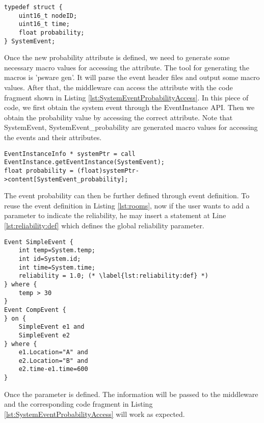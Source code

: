\begin{lstlisting}[caption=Customized system event, label=lst:SystemEventProbability]
typedef struct {
	uint16_t nodeID;
	uint16_t time;
	float probability;
} SystemEvent;
\end{lstlisting}

Once the new probability attribute is defined, we need to generate some necessary macro values for accessing the attribute. The tool for generating the macros is 'psware gen'. It will parse the event header files and output some macro values. After that, the middleware can access the attribute with the code fragment shown in Listing \ref{lst:SystemEventProbabilityAccess}. In this piece of code, we first obtain the system event through the EventInstance API. Then we obtain the probability value by accessing the correct attribute. Note that SystemEvent, SystemEvent\_probability are generated macro values for accessing the events and their attributes.

\begin{lstlisting}[caption=Customized system event, label=lst:SystemEventProbabilityAccess]
EventInstanceInfo * systemPtr = call EventInstance.getEventInstance(SystemEvent);
float probability = (float)systemPtr->content[SystemEvent_probability];
\end{lstlisting}

The event probability can then be further defined through event definition. To reuse the event definition in Listing \ref{lst:rooms}, now if the user wants to add a parameter to indicate the reliability, he may insert a statement at Line \ref{lst:reliability:def} which defines the global reliability parameter.

\begin{lstlisting}[caption=Example of event definition with reliability, label=lst:reliability]
Event SimpleEvent {
	int temp=System.temp;
	int id=System.id;
	int time=System.time;
	reliability = 1.0; (* \label{lst:reliability:def} *)
} where {
	temp > 30
}
Event CompEvent {
} on {
	SimpleEvent e1 and
	SimpleEvent e2
} where {
	e1.Location="A" and
	e2.Location="B" and
	e2.time-e1.time=600
}
\end{lstlisting}

Once the parameter is defined. The information will be passed to the middleware and the corresponding code fragment in Listing \ref{lst:SystemEventProbabilityAccess} will work as expected.

